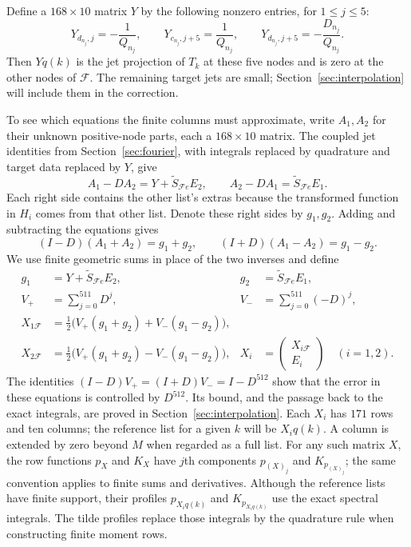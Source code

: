 Define a $168\times10$ matrix $Y$ by the following nonzero entries, for
$1\le j\le5$:
\[
 Y_{d_{n_j},j}=-\frac1{Q_{n_j}},\qquad
 Y_{c_{n_j},j+5}=\frac1{Q_{n_j}},\qquad
 Y_{d_{n_j},j+5}=-\frac{D_{n_j}}{Q_{n_j}}.
\]
Then $Yq(k)$ is the jet projection of $T_k$ at these five nodes and is zero
at the other nodes of $\mathcal F$.  The remaining target jets are small;
Section~\ref{sec:interpolation} will include them in the correction.

To see which equations the finite columns must approximate, write
$A_1,A_2$ for their unknown positive-node parts, each a $168\times10$ matrix.
The coupled jet identities from Section~\ref{sec:fourier}, with integrals
replaced by quadrature and target data replaced by $Y$, give
\[
 A_1-DA_2=Y+\widetilde S_{\mathcal F e}E_2,
 \qquad
 A_2-DA_1=\widetilde S_{\mathcal F e}E_1.
\]
Each right side contains the other list's extras because the transformed
function in $H_i$ comes from that other list.  Denote these right sides by
$g_1,g_2$.  Adding and subtracting the equations gives
\[
 (I-D)(A_1+A_2)=g_1+g_2,
 \qquad
 (I+D)(A_1-A_2)=g_1-g_2.
\]
We use finite geometric sums in place of the two inverses and define
\begin{equation}\label{eq:finite-columns}
\begin{aligned}
 g_1&=Y+\widetilde S_{\mathcal F e}E_2,&
 g_2&=\widetilde S_{\mathcal F e}E_1,\\
 V_+&=\sum_{j=0}^{511}D^j,&
 V_-&=\sum_{j=0}^{511}(-D)^j,\\
 X_{1\mathcal F}
 &=\tfrac12\bigl(V_+(g_1+g_2)+V_-(g_1-g_2)\bigr),\\
 X_{2\mathcal F}
 &=\tfrac12\bigl(V_+(g_1+g_2)-V_-(g_1-g_2)\bigr),&
 X_i&=\begin{pmatrix}X_{i\mathcal F}\\E_i\end{pmatrix}\quad(i=1,2).
\end{aligned}
\end{equation}
The identities $(I-D)V_+=(I+D)V_-=I-D^{512}$ show that the error in
these equations is controlled by $D^{512}$.  Its bound, and the passage
back to the exact integrals, are proved in Section~\ref{sec:interpolation}.
Each $X_i$ has $171$ rows and ten columns; the reference list for a given
$k$ will be $X_iq(k)$.  A column is extended by zero beyond $M$ when
regarded as a full list.  For any such matrix $X$, the row
functions $p_X$ and $K_X$ have $j$th components $p_{(X)_j}$ and
$K_{p_{(X)_j}}$; the same convention applies to finite sums and derivatives.
Although the reference lists have finite support, their profiles $p_{X_iq(k)}$
and $K_{p_{X_iq(k)}}$ use the exact spectral integrals.  The tilde profiles
replace those integrals by the quadrature rule when constructing finite
moment rows.


